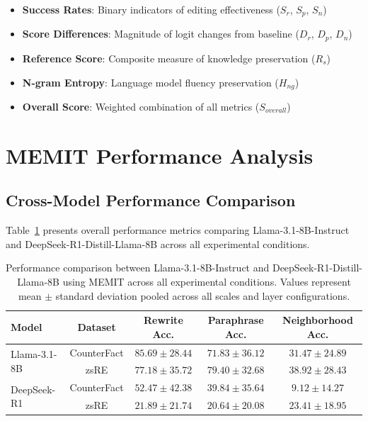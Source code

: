 \begin{itemize}
    \item \textbf{Success Rates}: Binary indicators of editing effectiveness ($S_r$, $S_p$, $S_n$)
    \item \textbf{Score Differences}: Magnitude of logit changes from baseline ($D_r$, $D_p$, $D_n$)
    \item \textbf{Reference Score}: Composite measure of knowledge preservation ($R_s$)
    \item \textbf{N-gram Entropy}: Language model fluency preservation ($H_{ng}$)
    \item \textbf{Overall Score}: Weighted combination of all metrics ($S_{overall}$)
\end{itemize}


\section{MEMIT Performance Analysis}
\label{sec:memit_performance}

\subsection{Cross-Model Performance Comparison}
\label{subsec:cross_model_performance}

Table~\ref{tab:model_comparison} presents overall performance metrics comparing Llama-3.1-8B-Instruct and DeepSeek-R1-Distill-Llama-8B across all experimental conditions.

\begin{table}[H]
\centering
\caption[MEMIT Performance Comparison Across Models]{Performance comparison between Llama-3.1-8B-Instruct and DeepSeek-R1-Distill-Llama-8B using MEMIT across all experimental conditions. Values represent mean $\pm$ standard deviation pooled across all scales and layer configurations.}
\label{tab:model_comparison}
\begin{tabular}{lcccc}
\toprule
\textbf{Model} & \textbf{Dataset} & \textbf{Rewrite Acc.} & \textbf{Paraphrase Acc.} & \textbf{Neighborhood Acc.} \\
\midrule
\multirow{2}{*}{Llama-3.1-8B} & CounterFact & $85.69 \pm 28.44$ & $71.83 \pm 36.12$ & $31.47 \pm 24.89$ \\
 & zsRE & $77.18 \pm 35.72$ & $79.40 \pm 32.68$ & $38.92 \pm 28.43$ \\
\midrule
\multirow{2}{*}{DeepSeek-R1} & CounterFact & $52.47 \pm 42.38$ & $39.84 \pm 35.64$ & $9.12 \pm 14.27$ \\
 & zsRE & $21.89 \pm 21.74$ & $20.64 \pm 20.08$ & $23.41 \pm 18.95$ \\
\bottomrule
\end{tabular}
\end{table}

